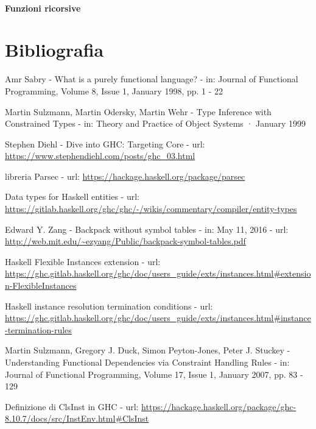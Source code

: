 \documentclass[10pt,a4paper]{article}
\begin{document}
\paragraph{Funzioni ricorsive}

\section*{Bibliografia}
\begin{enumerate}[label={[\arabic*]}]
    \item Amr Sabry - What is a purely functional language? - in: Journal of Functional Programming, Volume 8, Issue 1,
    January 1998, pp. 1 - 22
    \item Martin Sulzmann, Martin Odersky, Martin Wehr - Type Inference with Constrained Types - in: Theory and Practice
    of Object Systems · January 1999
    \item Stephen Diehl - Dive into GHC: Targeting Core - url: \url{https://www.stephendiehl.com/posts/ghc_03.html}
    \item libreria Parsec - url: \url{https://hackage.haskell.org/package/parsec}
    \item Data types for Haskell entities - url:
    \url{https://gitlab.haskell.org/ghc/ghc/-/wikis/commentary/compiler/entity-types}
    \item Edward Y. Zang - Backpack without symbol tables - in: May 11, 2016 - url:
    \url{http://web.mit.edu/~ezyang/Public/backpack-symbol-tables.pdf}
    \item Haskell Flexible Instances extension - url:
    \url{https://ghc.gitlab.haskell.org/ghc/doc/users_guide/exts/instances.html#extension-FlexibleInstances}
    \item Haskell instance resolution termination conditions - url:
    \url{https://ghc.gitlab.haskell.org/ghc/doc/users_guide/exts/instances.html#instance-termination-rules}
    \item Martin Sulzmann, Gregory J. Duck, Simon Peyton-Jones, Peter J. Stuckey - Understanding Functional Dependencies
    via Constraint Handling Rules - in: Journal of Functional Programming, Volume 17, Issue 1, January 2007, pp. 83 - 129
    \item Definizione di ClsInst in GHC - url: \url{https://hackage.haskell.org/package/ghc-8.10.7/docs/src/InstEnv.html#ClsInst}
\end{enumerate}
\end{document}
